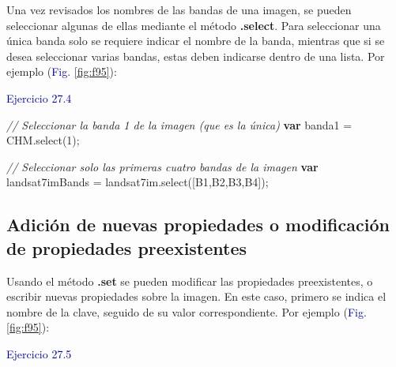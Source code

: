 \documentclass[
  12pt,
  letterpaper,
  twoside]{book}
\newenvironment{Shaded}{\begin{snugshade}}{\end{snugshade}}
\newcommand{\CommentTok}[1]{\textcolor[rgb]{0.24,0.58,0.00}{\textit{#1}}}
\newcommand{\FunctionTok}[1]{\textcolor[rgb]{0.48,0.12,0.64}{#1}}
\newcommand{\KeywordTok}[1]{\textcolor[rgb]{0.00,0.00,0.00}{\textbf{#1}}}
\newcommand{\NormalTok}[1]{#1}
\newcommand{\OperatorTok}[1]{\textcolor[rgb]{0.00,0.00,0.00}{#1}}
\newcommand{\StringTok}[1]{\textcolor[rgb]{0.87,0.29,0.22}{#1}}
\newcommand\boldpurple[1]{\textcolor{darkpurple}{\textbf{#1}}}
\begin{document}
Una vez revisados los nombres de las bandas de una imagen, se pueden seleccionar algunas de ellas mediante el método \boldpurple{.select}. Para seleccionar una única banda solo se requiere indicar el nombre de la banda, mientras que si se desea seleccionar varias bandas, estas deben indicarse dentro de una lista. Por ejemplo (\textcolor{darkblue}{Fig.} \ref{fig:f95}):

\textcolor{darkblue}{Ejercicio 27.4}

\begin{Shaded}
\begin{Highlighting}[]
\CommentTok{// Seleccionar la banda 1 de la imagen (que es la única)}
\KeywordTok{var}\NormalTok{ banda1 }\OperatorTok{=}\NormalTok{ CHM}\OperatorTok{.}\FunctionTok{select}\NormalTok{(}\StringTok{\textquotesingle{}1\textquotesingle{}}\NormalTok{)}\OperatorTok{;}

\CommentTok{// Seleccionar solo las primeras cuatro bandas de la imagen}
\KeywordTok{var}\NormalTok{ landsat7imBands }\OperatorTok{=}\NormalTok{ landsat7im}\OperatorTok{.}\FunctionTok{select}\NormalTok{([}\StringTok{\textquotesingle{}B1\textquotesingle{}}\OperatorTok{,}\StringTok{\textquotesingle{}B2\textquotesingle{}}\OperatorTok{,}\StringTok{\textquotesingle{}B3\textquotesingle{}}\OperatorTok{,}\StringTok{\textquotesingle{}B4\textquotesingle{}}\NormalTok{])}\OperatorTok{;}
\end{Highlighting}
\end{Shaded}

\hypertarget{adiciuxf3n-de-nuevas-propiedades-o-modificaciuxf3n-de-propiedades-preexistentes-1}{%
\subsection*{Adición de nuevas propiedades o modificación de propiedades preexistentes}\label{adiciuxf3n-de-nuevas-propiedades-o-modificaciuxf3n-de-propiedades-preexistentes-1}}

Usando el método \boldpurple{.set} se pueden modificar las propiedades preexistentes, o escribir nuevas propiedades sobre la imagen. En este caso, primero se indica el nombre de la clave, seguido de su valor correspondiente. Por ejemplo (\textcolor{darkblue}{Fig.} \ref{fig:f95}):

\textcolor{darkblue}{Ejercicio 27.5}
\end{document}
